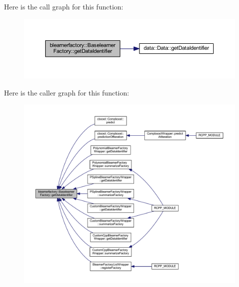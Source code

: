 Here is the call graph for this function\+:\nopagebreak
\begin{figure}[H]
\begin{center}
\leavevmode
\includegraphics[width=350pt]{classblearnerfactory_1_1_baselearner_factory_a40703963bb3fd273b835a99263d9b599_cgraph}
\end{center}
\end{figure}
Here is the caller graph for this function\+:\nopagebreak
\begin{figure}[H]
\begin{center}
\leavevmode
\includegraphics[width=350pt]{classblearnerfactory_1_1_baselearner_factory_a40703963bb3fd273b835a99263d9b599_icgraph}
\end{center}
\end{figure}
\mbox{\label{classblearnerfactory_1_1_baselearner_factory_a147d4ef123ec382fe402d562a91df4d2}} 
